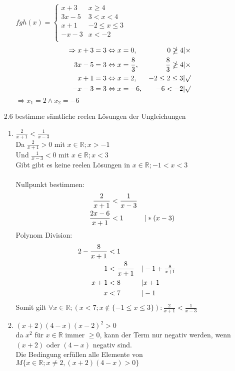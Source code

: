 \documentclass[12pt,letterpaper]{article}
\newcommand{\alignleft}[1]{\tag*{\llap{\makebox[\linewidth][l]{$#1$}}}}
\newcommand{\LLeftrightarrow}{ \alignleft{\Leftrightarrow}}
\newcommand{\eqinfo}[1]{&\makebox[2cm][l]{$\vert #1$}}
\newcommand{\Eqn}[3]{#1 &#2 #3}
\newcommand{\geqnf}[3]{\Eqn{#1}{#2}{#3}\\}
\newcommand{\geqni}[4]{\LLeftrightarrow\Eqn{#1}{#2}{#3}\eqinfo{#4}\\}
\begin{document}
\begin{enumerate}
\begin{enumerate}
$fgh(x) = \begin{cases}
x+3 &x\geq 4\\
3x-5 &3<x<4\\
x+1 &-2\leq x\leq 3\\
-x-3 &x<-2\\
\end{cases}$\\
\begin{align*}
\Rightarrow x+3&=3 \Leftrightarrow x=0, &0\ngeq 4|\times \\
3x-5&=3 \Leftrightarrow x=\frac{8}{3}, &\frac{8}{3}\ngeq 4|\times \\
x+1&=3 \Leftrightarrow x=2, &-2\leq 2\leq 3|\surd\\
-x-3&=3 \Leftrightarrow x=-6, &-6<-2|\surd\\
\end{align*}
$\Rightarrow x_1 = 2 \land x_2 = -6$
\end{enumerate}
\item [2.6] bestimme sämtliche reelen Lösungen der Ungleichungen
\begin{enumerate}
\item $\frac{2}{x+1}<\frac{1}{x-3}$\\
Da $\frac{2}{x+1} > 0$ mit $x\in\mathbb{R};x>-1$\\
Und $\frac{1}{x-3} < 0$ mit $x\in\mathbb{R};x<3$\\
Gibt gibt es keine reelen Lösungen in $x\in\mathbb{R};-1<x<3$\\
\\
Nullpunkt bestimmen:\\
\begin{align*}
	\geqnf{\frac{2}{x+1}}{<}{\frac{1}{x-3}}
	\geqni{\frac{2x-6}{x+1}}{<}{1}{*(x-3)}	
\end{align*}
Polynom Division:\\
\begin{align*}
	\geqnf{2-\frac{8}{x+1}}{<}{1}
	\geqni{1}{<}{\frac{8}{x+1}}{-1+\frac{8}{x+1}}
	\geqni{x+1}{<}{8}{x+1}
	\geqni{x}{<}{7}{-1}	
\end{align*}
Somit gilt $\forall x\in\mathbb{R};(x<7;x\notin\{-1\leq x\leq3\}):\frac{2}{x+1}<\frac{1}{x-3}$
\item $\left(x+2\right)\left(4-x\right)\left(x-2\right)^2>0$\\
da $x^2$ für $x\in\mathbb{R}$ immer $\geq 0$, kann der Term nur negativ werden, wenn $(x+2)$ oder $(4-x)$ negativ sind.\\
Die Bedingung erfüllen alle Elemente von $M \lbrace x\in\mathbb{R}; x\neq 2, (x+2)(4-x)>0 \rbrace$\\

\end{enumerate}
\end{enumerate}
\end{document}
